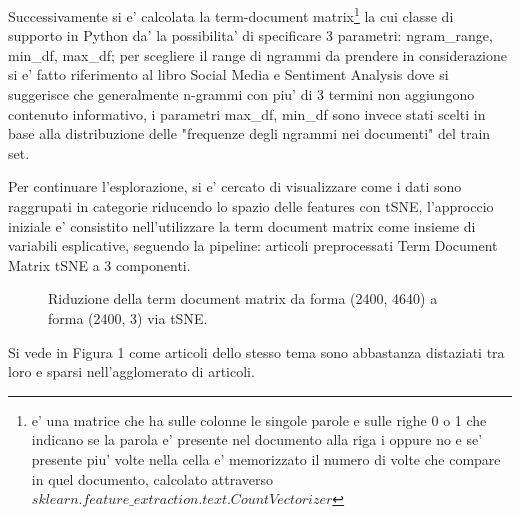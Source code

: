 \documentclass[runningheads]{llncs}
\begin{document}
Successivamente si e' calcolata la term-document matrix\footnote{e' una matrice che ha sulle colonne le singole parole e sulle righe 0 o 1 che indicano se la parola e' presente nel documento alla riga i oppure no e se' presente piu' volte nella cella e' memorizzato il numero di volte che compare in quel documento, calcolato attraverso    $sklearn.feature\_extraction.text.CountVectorizer$}  la cui classe di supporto in Python da' la possibilita' di specificare 3 parametri: ngram\_range, min\_df, max\_df; per scegliere il
range di ngrammi da prendere in considerazione si e' fatto riferimento al libro Social Media e Sentiment Analysis\cite{NGRAM} dove si suggerisce che generalmente n-grammi con piu' di 3 termini non aggiungono contenuto informativo, i parametri max\_df, min\_df sono invece stati scelti in base alla distribuzione delle "frequenze degli ngrammi nei documenti" del train set.


Per continuare l'esplorazione, si e' cercato di visualizzare come i dati sono raggrupati in categorie riducendo lo spazio delle features con tSNE, l'approccio iniziale e' consistito nell'utilizzare la term document matrix
come insieme di variabili esplicative, seguendo la pipeline: articoli preprocessati \textpipe Term Document Matrix \textpipe tSNE a 3 componenti.

\begin{figure}%
    \centering
    \qquad
    \caption{Riduzione della term document matrix da forma (2400, 4640) a forma (2400, 3) via tSNE. }%
    \label{fig:tsne1}%
\end{figure} 

Si vede in Figura 1 come articoli dello stesso tema sono abbastanza distaziati tra loro e sparsi nell'agglomerato di 
articoli.\par
\end{document}
